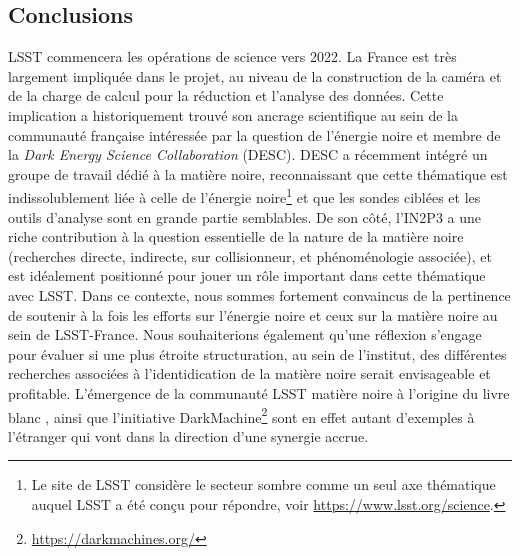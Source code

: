 \documentclass[12pt]{article}
\begin{document}
\vspace{-1em} \subsection*{Conclusions} \vspace{-0.5em}

LSST commencera les opérations de science vers 2022. La France est très largement impliquée dans le projet, au niveau de la construction de la caméra et de la charge de calcul pour la réduction et l'analyse des données. Cette implication a historiquement trouvé son ancrage scientifique au sein de la communauté française intéressée par la question de l'énergie noire et membre de la {\it Dark Energy Science Collaboration} (DESC). DESC a récemment intégré un groupe de travail dédié à la matière noire, reconnaissant que cette thématique est indissolublement liée à celle de l'énergie noire\footnote{Le site de LSST considère le secteur sombre comme un seul axe thématique auquel LSST a été conçu pour répondre, voir \href{https://www.lsst.org/science}{https://www.lsst.org/science}. } et que les sondes ciblées et les outils d'analyse sont en grande partie semblables.
De son côté, l'IN2P3 a une riche contribution à la question essentielle de la nature de la matière noire (recherches directe, indirecte, sur collisionneur, et phénoménologie associée), et est idéalement positionné pour jouer un rôle important dans cette thématique avec LSST. Dans ce contexte, nous sommes fortement convaincus de la pertinence de soutenir à la fois les efforts sur l’énergie noire et ceux sur la matière noire au sein de LSST-France. Nous souhaiterions également qu'une réflexion s'engage pour évaluer si une plus étroite structuration, au sein de l'institut, des différentes recherches associées à l'identidication de la matière noire serait envisageable et profitable. L'émergence de la communauté LSST matière noire à l'origine du livre blanc \citep{drlica-wagner_2019_lsst_dark_matter}, ainsi que l'initiative {\sc DarkMachine}\footnote{\href{https://darkmachines.org/}{https://darkmachines.org/}} sont en effet autant d'exemples à l'étranger qui vont dans la direction d'une synergie accrue. 





\def\bibname{References}
\begingroup
  \small
  \setlength{\bibsep}{0pt plus 0.5ex}
  
  
\endgroup

\end{document}
